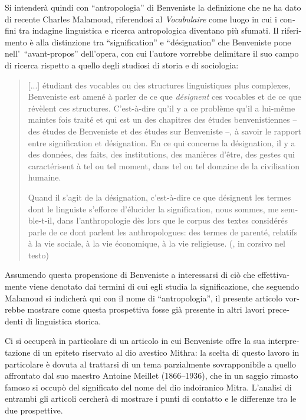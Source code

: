 \documentclass[output=paper]{../langscibook}
\begin{document}
\begin{otherlanguage}{italian}
Si intenderà quindi con “antropologia” di Benveniste la definizione che ne ha dato di recente Charles Malamoud, riferendosi al \textit{Vocabulaire} come luogo in cui i confini tra indagine linguistica e ricerca antropologica diventano più sfumati. Il riferimento è alla distinzione tra “signification” e “désignation” che Benveniste pone nell’~“avant-propos” dell’opera, con cui l’autore vorrebbe delimitare il suo campo di ricerca rispetto a quello degli studiosi di storia e di sociologia:

\begin{quote}
    [...] étudiant des vocables ou des structures linguistiques plus complexes, Benveniste est amené à parler de ce que \textit{désignent} ces vocables et de ce que révèlent ces structures. C’est-à-dire qu’il y a ce problème qu’il a lui-même maintes fois traité et qui est un des chapitres des études benvenistiennes – des études de Benveniste et des études sur Benveniste –, à savoir le rapport entre signification et désignation.  En ce qui concerne la désignation, il y a des données, des faits, des institutions, des manières d’être, des gestes qui caractérisent à tel ou tel moment, dans tel ou tel domaine de la civilisation humaine. 

    Quand il s’agit de la désignation, c’est-à-dire ce que désignent les termes dont le linguiste s’efforce d’élucider la signification, nous sommes, me semble-t-il, dans l’anthropologie dès lors que le corpus des textes considérés parle de ce dont parlent les anthropologues: des termes de parenté, relatifs à la vie sociale, à la vie économique, à la vie religieuse. (\citealt[246]{fenoglio_lanthropologie_2016}, in corsivo nel testo)
\end{quote}

Assumendo questa propensione di Benveniste a interessarsi di ciò che effettivamente viene denotato dai termini di cui egli studia la significazione, che seguendo Malamoud si indicherà qui con il nome di “antropologia”, il presente articolo vorrebbe mostrare come questa prospettiva fosse già presente in altri lavori precedenti di linguistica storica. 

Ci si occuperà in particolare di un articolo in cui Benveniste offre la sua interpretazione di un epiteto riservato al dio avestico Mithra: la scelta di questo lavoro in particolare è dovuta al trattarsi di un tema parzialmente sovrapponibile a quello affrontato dal suo maestro Antoine Meillet (1866--1936), che in un saggio rimasto famoso si occupò del significato del nome del dio indoiranico Mitra. L’analisi di entrambi gli articoli cercherà di mostrare i punti di contatto e le differenze tra le due prospettive.


\end{otherlanguage}
\end{document}
